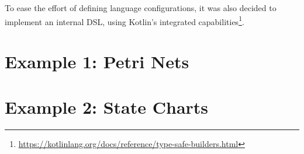 To ease the effort of defining language configurations, it was also decided to implement an internal DSL, using Kotlin's integrated capabilities\footnote{\url{https://kotlinlang.org/docs/reference/type-safe-builders.html}}.


\section{Example 1: Petri Nets}

\section{Example 2: State Charts}
